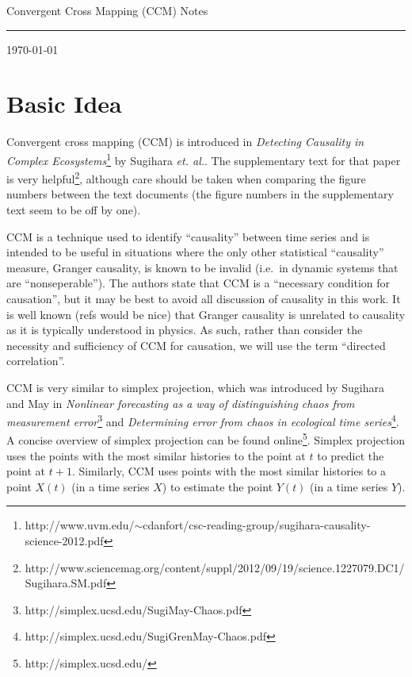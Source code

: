 \documentclass[a4paper,11pt]{article}
\begin{document}
{\Huge Convergent Cross Mapping (CCM) Notes}

\hfill\rule{150mm}{.1pt}

\hfill{\small \today}

\section{Basic Idea}
Convergent cross mapping (CCM) is introduced in {\em Detecting Causality in
Complex Ecosystems}\footnote{http://www.uvm.edu/$\sim$cdanfort/csc-reading-group/sugihara-causality-science-2012.pdf} by Sugihara {\em et. al.}.  The supplementary text for that paper is very helpful\footnote{http://www.sciencemag.org/content/suppl/2012/09/19/science.1227079.DC1/Sugihara.SM.pdf}, although care should be taken when comparing the figure numbers between the text documents (the figure numbers in the supplementary text seem to be off by one).

CCM is a technique used to identify ``causality'' between time series and is intended to be useful in situations where the only other statistical ``causality'' measure, Granger causality, is known to be invalid (i.e.\ in dynamic systems that are ``nonseperable'').  The authors state that CCM is a ``necessary condition for causation'', but it may be best to avoid all discussion of causality in this work.  It is well known (refs would be nice) that Granger causality is unrelated to causality as it is typically understood in physics.  As such, rather than consider the necessity and sufficiency of CCM for causation, we will use the term ``directed correlation''. 

CCM is very similar to simplex projection, which was introduced by Sugihara and May in {\em Nonlinear forecasting as a way of distinguishing chaos from measurement error}\footnote{http://simplex.ucsd.edu/SugiMay-Chaos.pdf} and {\em Determining error from chaos in ecological time series}\footnote{http://simplex.ucsd.edu/SugiGrenMay-Chaos.pdf}.  A concise overview of simplex projection can be found online\footnote{http://simplex.ucsd.edu/}.  Simplex projection uses the points with the most similar histories to the point at $t$ to predict the point at $t+1$.  Similarly, CCM uses points with the most similar histories to a point $X(t)$ (in a time series $X$) to estimate the point $Y(t)$ (in a time series $Y$).
\end{document}
